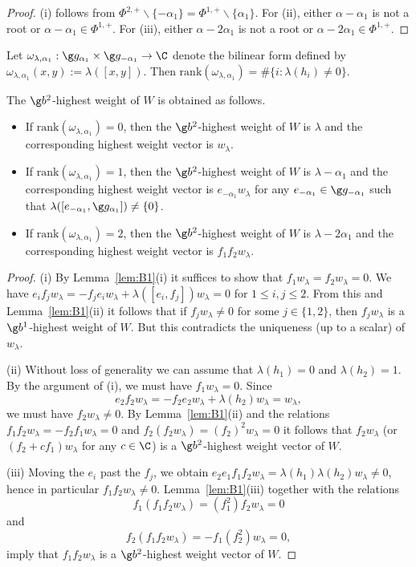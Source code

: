 \documentclass[12pt]{amsart}
\begin{document}
\begin{proof}
(i) follows from $\Phi^{2,+}\backslash\{-\alpha_1\}= \Phi^{1,+}\backslash \{\alpha_1\}$.
 For (ii), either $\alpha-\alpha_1$ is not a root or $\alpha-\alpha_1\in \Phi^{1,+}$. For (iii), either $\alpha-2\alpha_1$ is not a root or $\alpha-2\alpha_1\in \Phi^{1,+}$.
\end{proof}
Let $\omega_{\lambda,\alpha_1}:\g g_{\alpha_1}\times \g g_{-\alpha_1}\to\C$ denote the bilinear form defined by $\omega_{\lambda,\alpha_1}(x,y):=\lambda([x,y])$. Then  $\mathrm{rank}(\omega_{\lambda,\alpha_1})=\#\{i:\lambda(h_i)\neq 0\}$.  
\begin{prp}\label{prp:hwsl22}
The $\g b^2$-highest weight of $W$ is obtained as follows.
\begin{itemize}
\item[\rm (i)]
If $\mathrm{rank}(\omega_{\lambda,\alpha_1})=0$, then the $\g b^2$-highest weight of $W$ is $\lambda$ and the corresponding highest weight vector is $w_\lambda$. 
\item[\rm (ii)]
If $\mathrm{rank}(\omega_{\lambda,\alpha_1})=1$, then 
the $\g b^2$-highest weight of $W$ is $\lambda-\alpha_1$ and the corresponding  highest weight vector is $e_{-\alpha_1}w_\lambda$ for any $e_{-\alpha_1}\in\g g_{-\alpha_1}$ such that  $\lambda([e_{-\alpha_1},\g g_{\alpha_1}])\neq \{0\}$.
\item[\rm (iii)]
If $\mathrm{rank}(\omega_{\lambda,\alpha_1})=2$, then 
the $\g b^2$-highest weight of $W$ is $\lambda-2\alpha_1$ and the corresponding  highest weight vector is $f_1f_2w_\lambda$.


\end{itemize}
\end{prp} 
\begin{proof}
(i) By Lemma~\ref{lem:B1}(i) it suffices to show that $f_1w_\lambda=f_2w_\lambda=0$. We have 
$e_if_jw_\lambda=
-f_je_iw_\lambda+\lambda([e_i,f_j])w_\lambda=0$ for $1\leq i,j\leq 2$. From this and
Lemma~\ref{lem:B1}(ii) it follows 
that if $f_jw_\lambda\neq 0$ for some $j\in\{1,2\}$, then
$f_j w_\lambda$ is a $\g b^1$-highest weight of $W$. But this contradicts the uniqueness (up to a scalar) of $w_\lambda$.  


(ii) Without loss of generality we can assume that $\lambda(h_1)=0$ and $\lambda(h_2)=1$. By the argument of (i), we  must have $f_1w_\lambda=0$. Since \[
e_2f_2w_\lambda=-f_2e_2w_\lambda+\lambda(h_2)w_\lambda=w_\lambda,
\] we must have $f_2w_\lambda\neq 0$.  By Lemma~\ref{lem:B1}(ii) and the relations $f_1f_2w_\lambda=-f_2f_1w_\lambda=0$ and 
$f_2(f_2w_\lambda)=(f_2)^2w_\lambda=0$ it follows that $f_2w_\lambda$ (or $(f_2+cf_1)w_\lambda$ for any $c\in\C$) is a $\g b^2$-highest weight vector of $W$. 

(iii) Moving the $e_i$ past the $f_j$, we obtain  $e_2e_1f_1f_2w_\lambda=\lambda(h_1)\lambda(h_2)w_\lambda\neq 0$, hence in particular $f_1f_2w_\lambda\neq 0$. 
Lemma~\ref{lem:B1}(iii) together with the relations \[
f_1(f_1f_2w_\lambda)=(f_1^2)f_2w_\lambda=0
\] 
and \[
f_2(f_1f_2w_\lambda)=-f_1(f_2^2)w_\lambda=0,
\] imply that  $f_1f_2w_\lambda$ is a $\g b^2$-highest weight vector of $W$. 
\end{proof}
\end{document}
